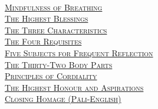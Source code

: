 {  {\libertinusFont\selectfont\textbf{\textsc{\ifafiveversion\fontsize{18}{12}\fi\ifninebythirteenversion\fontsize{13}{8.5}\fi\ifbfiveversion\fontsize{22}{18}\fi\selectfont{}}}}\\
  \textsc{\ifafiveversion\fontsize{14.4}{28}\fi\ifninebythirteenversion\fontsize{8.7}{17}\fi\ifbfiveversion\fontsize{16}{33.5}\fi\selectfont
    \hyperref[mindfulness-of-breathing]{Mindfulness of Breathing} \ifdigitalversion\else\pageref{mindfulness-of-breathing}\fi\\
    \hyperref[highest-blessings]{The Highest Blessings} \ifdigitalversion\else\pageref{highest-blessings}\fi\\
    \hyperref[three-characteristics]{The Three Characteristics} \ifdigitalversion\else\pageref{three-characteristics}\fi\\
    \hyperref[four-requisites]{The Four Requisites} \ifdigitalversion\else\pageref{four-requisites}\fi\\
    \hyperref[five-reflections]{Five Subjects for Frequent Reflection} \ifdigitalversion\else\pageref{five-reflections}\fi\\
    \hyperref[32-parts]{The Thirty-Two Body Parts} \ifdigitalversion\else\pageref{32-parts}\fi\\
    \hyperref[principles-of-cordiality]{Principles of Cordiality} \ifdigitalversion\else\pageref{principles-of-cordiality}\fi\\
    \hyperref[highest-honour-aspirations]{The Highest Honour and Aspirations} \ifdigitalversion\else\pageref{highest-honour-aspirations}\fi\\
    \hyperref[closing-homage]{Closing Homage (Pāli-English)} \ifdigitalversion\else\pageref{closing-homage}\fi\\
  }

  \ifafiveversion\vspace{1.0cm}\fi
  \ifninebythirteenversion\vspace{0.8cm}\fi
  \ifbfiveversion\vspace{1.0cm}\fi

}
